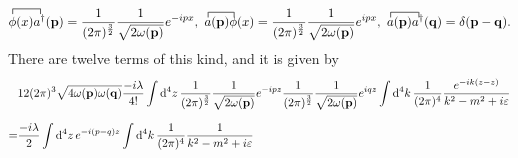 \begin{align*}
	\contraction{}{\phi}{(x)}{a\adj}\phi(x)a\adj(\vb{p}) = \frac{1}{(2\pi)^{\frac{3}{2}}}\frac{1}{\sqrt{2\omega(\vb{p})}}e^{-ipx},\ \contraction{}{a}{(\vb{p})}{\phi}a(\vb{p})\phi(x) = \frac{1}{(2\pi)^{\frac{3}{2}}}\frac{1}{\sqrt{2\omega(\vb{p})}}e^{ipx},\ \contraction{}{a}{(\vb{p})}{a\adj}a(\vb{p})a\adj(\vb{q}) = \delta(\vb{p} - \vb{q}).
\end{align*}
There are twelve terms of this kind, and it is given by
\begin{align*}
	&12(2\pi)^{3}\sqrt{4\omega(\vb{p})\omega(\vb{q})}\frac{-i\lambda}{4!}\int\limits_{}^{}\dd[4]{z}\frac{1}{(2\pi)^{\frac{3}{2}}}\frac{1}{\sqrt{2\omega(\vb{p})}}e^{-ipz}\frac{1}{(2\pi)^{\frac{3}{2}}}\frac{1}{\sqrt{2\omega(\vb{p})}}e^{iqz}\int\limits_{}^{}\dd[4]{k}\frac{1}{(2\pi)^{4}}\frac{e^{-ik(z - z)}}{k^{2} - m^{2} + i\varepsilon} \\
	=& \frac{-i\lambda}{2}\int\limits_{}^{}\dd[4]{z}e^{-i(p - q)z}\int\limits_{}^{}\dd[4]{k}\frac{1}{(2\pi)^{4}}\frac{1}{k^{2} - m^{2} + i\varepsilon}
\end{align*}

